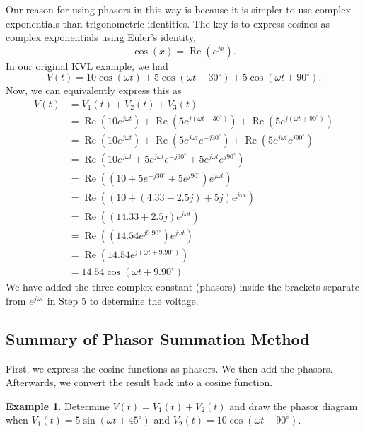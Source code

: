 \documentclass[11pt]{article}
\theoremstyle{plain} %
\theoremstyle{definition}
\theoremstyle{example}
\newtheorem*{example}{Example}
\theoremstyle{remark}
\begin{document}
Our reason for using phasors in this way is because it is simpler to use complex exponentials than trigonometric identities. The key is to express cosines as complex exponentials using Euler's identity,
$$\cos(x) = \operatorname{Re}\left(e^{jx}\right).$$
In our original KVL example, we had 
$$V(t) = 10\cos(\omega t ) + 5\cos(\omega t - 30^{\circ}) + 5\cos(\omega t + 90^{\circ}).$$
Now, we can equivalently express this as 
\begin{align*}
V(t) &= V_1(t) + V_2(t) + V_3(t)\\
	&= \operatorname{Re}\left(10e^{j\omega t}\right) + \operatorname{Re}\left(5e^{j\left(\omega t -30^{\circ}\right)}\right) + \operatorname{Re}\left(5e^{j\left(\omega t + 90^{\circ}\right)}\right)\\
	&= \operatorname{Re}\left(10e^{j\omega t}\right)+\operatorname{Re}\left(5e^{j\omega t}e^{-j30^{\circ}}\right)+\operatorname{Re}\left(5e^{j\omega t}e^{j90^{\circ}}\right)\\
	&= \operatorname{Re}\left(10e^{j\omega t}+5e^{j\omega t}e^{-j30^{\circ}}+5e^{j\omega t}e^{j90^{\circ}}\right)\\
	&= \operatorname{Re}\left(\left(10+5e^{-j30^{\circ}}+5e^{j90^{\circ}}\right)e^{j\omega t}\right)\\
	&= \operatorname{Re}\left(\left(10+(4.33-2.5j)+5j\right)e^{j\omega t}\right)\\
	&= \operatorname{Re}\left((14.33+2.5j)e^{j\omega t}\right)\\
	&= \operatorname{Re}\left(\left(14.54e^{j9.90^{\circ}}\right)e^{j\omega t}\right)\\
	&= \operatorname{Re}\left(14.54e^{j\left(\omega t + 9.90^{\circ}\right)}\right)\\
	&= 14.54\cos\left(\omega t + 9.90^{\circ}\right)
\end{align*}
We have added the three complex constant (phasors) inside the brackets separate from $e^{j\omega t}$ in Step 5 to determine the voltage. 



\subsection{Summary of Phasor Summation Method}
First, we express the cosine functions as phasors. We then add the phasors. Afterwards, we convert the result back into a cosine function.

\begin{example}
Determine $V(t) = V_1(t) + V_2(t)$ and draw the phasor diagram when $V_1(t) = 5\sin\left(\omega t + 45^{\circ}\right)$ and $V_2(t) = 10\cos\left(\omega t + 90^{\circ}\right)$. 
\end{example}
\end{document}
